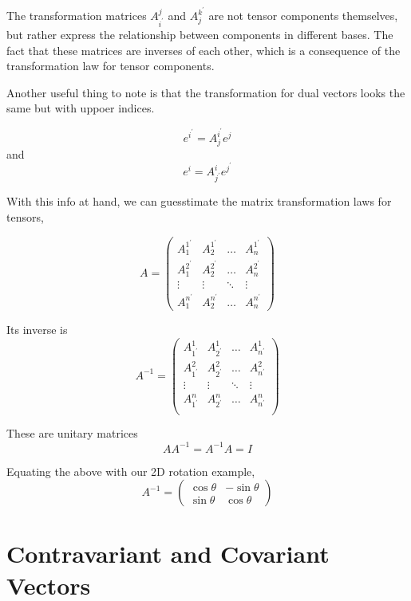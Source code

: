 The transformation matrices $A_{i^{\prime}}^{j}$ and $A_{j}^{k^{\prime}}$ are not tensor components themselves,
but rather express the relationship between components in different bases.
The fact that these matrices are inverses of each other, which is a consequence of the transformation law for
tensor components.

Another useful thing to note is that the transformation for dual vectors looks the same but with uppoer indices.

$$
e^{i^\prime} = A_{j}^{i^\prime} e^j
$$
and
$$
e^{i} = A_{j^\prime}^{i} e^{j^\prime}
$$

With this info at hand, we can guesstimate the matrix transformation laws for tensors,

$$
A =
\begin{pmatrix}
A_{1}^{1^\prime} & A_{2}^{1^\prime} & \dots  & A_{n}^{1^\prime} \\
A_{1}^{2^\prime} & A_{2}^{2^\prime} & \dots  & A_{n}^{2^\prime} \\
\vdots           & \vdots           & \ddots & \vdots           \\
A_{1}^{n^\prime} & A_{2}^{n^\prime} & \dots  & A_{n}^{n^\prime}
\end{pmatrix}
$$

Its inverse is
$$
A^{-1}
=
\begin{pmatrix}
A_{1^\prime}^{1} & A_{2^\prime}^{1} & \dots  & A_{n^\prime}^{1} \\
A_{1^\prime}^{2} & A_{2^\prime}^{2} & \dots  & A_{n^\prime}^{2} \\
\vdots           & \vdots           & \ddots & \vdots           \\
A_{1^\prime}^{n} & A_{2^\prime}^{n} & \dots  & A_{n^\prime}^{n} \\
\end{pmatrix}
$$

These are unitary matrices
$$
A A^{-1} = A^{-1} A = I
$$

Equating the above with our 2D rotation example,
$$
A^{-1}
=
\begin{pmatrix}
\cos\theta & - \sin\theta \\
\sin\theta & \cos\theta
\end{pmatrix}
$$


\section{Contravariant and Covariant Vectors}

